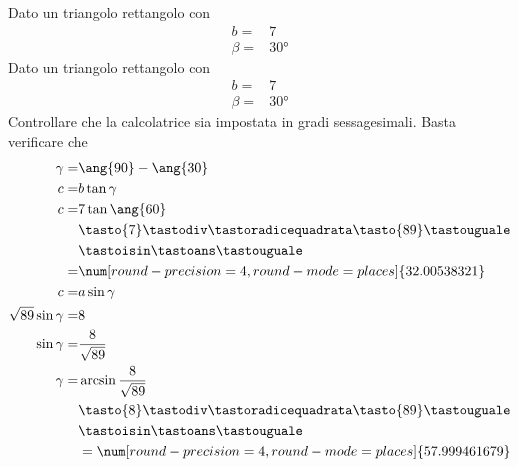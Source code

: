 \begin{exercise}
	Dato un triangolo rettangolo con
	\begin{align*}
	b=&7\\
	\beta=&\ang{30}
	\end{align*}
	\tcblower
		Dato un triangolo rettangolo con
	\begin{align*}
	b=&7\\
	\beta=&\ang{30}
	\end{align*}
	Controllare che la calcolatrice sia impostata in gradi sessagesimali.
	Basta verificare che \testgradi 
	\begin{align*}
	\gamma=&\ang{90}-\ang{30}\\
	c=&b\tan\gamma\\
	c=&7\tan\ang{60}\\
	&\tasto{7}\tastodiv\tastoradicequadrata\tasto{89}\tastouguale\\
	&\tastoisin\tastoans\tastouguale\\
	=&\num[round-precision=\lungarrotandamento,round-mode=places]{32.00538321}\\
	c=&a\sin\gamma\\
	\sqrt{89}\sin\gamma=&8\\
	\sin\gamma=&\frac{8}{\sqrt{89}}\\
	\gamma=&\arcsin\frac{8}{\sqrt{89}}\\
	&\tasto{8}\tastodiv\tastoradicequadrata\tasto{89}\tastouguale\\
	&\tastoisin\tastoans\tastouguale\\
	&=\num[round-precision=\lungarrotandamento,round-mode=places]{57.999461679}\\
	\end{align*}
\end{exercise}
